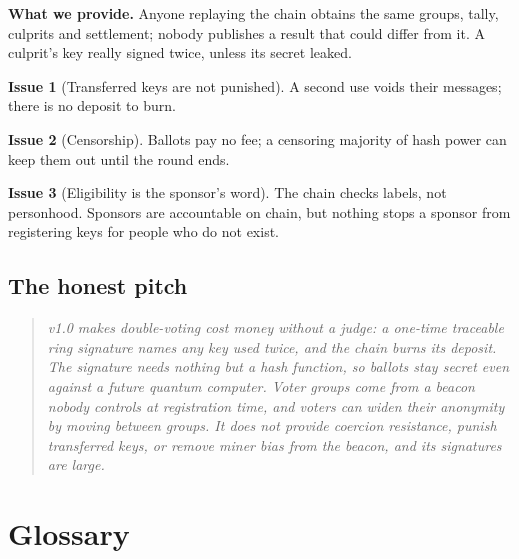 \documentclass[11pt,a4paper]{article}
\theoremstyle{definition}
\newtheorem{flaw}{Issue}
\begin{document}
\textbf{What we provide.} Anyone replaying the chain obtains the same
groups, tally, culprits and settlement; nobody publishes a result that
could differ from it. A culprit's key really signed twice, unless its
secret leaked.

\begin{flaw}[Transferred keys are not punished]
A second use voids their messages; there is no deposit to burn.
\end{flaw}

\begin{flaw}[Censorship]
Ballots pay no fee; a censoring majority of hash power can keep them out
until the round ends.
\end{flaw}

\begin{flaw}[Eligibility is the sponsor's word]
The chain checks labels, not personhood. Sponsors are accountable on chain,
but nothing stops a sponsor from registering keys for people who do not
exist.
\end{flaw}

\subsection{The honest pitch}

\begin{quote}
\itshape
v1.0 makes double-voting cost money without a judge: a one-time traceable
ring signature names any key used twice, and the chain burns its deposit.
The signature needs nothing but a hash function, so ballots stay secret
even against a future quantum computer. Voter groups come from a beacon
nobody controls at registration time, and voters can widen their anonymity
by moving between groups. It does not provide coercion resistance, punish
transferred keys, or remove miner bias from the beacon, and its signatures
are large.
\end{quote}

\appendix
\section{Glossary}
\end{document}
